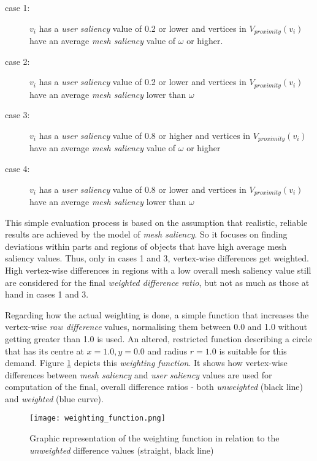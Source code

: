 \begin{description}
	\item [case 1:] $v_i$ has a \textit{user saliency} value of 0.2 or lower and vertices in $V_{proximity}(v_i)$ have an average \textit{mesh saliency} value of $\omega$ or higher.
	\item [case 2:] $v_i$ has a \textit{user saliency} value of 0.2 or lower and vertices in $V_{proximity}(v_i)$ have an average \textit{mesh saliency} lower than $\omega$
	\item [case 3:] $v_i$ has a \textit{user saliency} value of 0.8 or higher and vertices in $V_{proximity}(v_i)$ have an average \textit{mesh saliency} value of $\omega$ or higher
	\item [case 4:] $v_i$ has a \textit{user saliency} value of 0.8 or lower and vertices in $V_{proximity}(v_i)$ have an average \textit{mesh saliency} lower than $\omega$
\end{description}

This simple evaluation process is based on the assumption that realistic, reliable results are achieved by the model of \textit{mesh saliency}. So it focuses on finding deviations within parts and regions of objects that have high average mesh saliency values. Thus, only in cases 1 and 3, vertex-wise differences get weighted. High vertex-wise differences in regions with a low overall mesh saliency value still are considered for the final \textit{weighted difference ratio}, but not as much as those at hand in cases 1 and 3.

Regarding how the actual weighting is done, a simple function that increases the vertex-wise \textit{raw difference} values, normalising them between 0.0 and 1.0 without getting greater than 1.0 is used. An altered, restricted function describing a circle that has its centre at $x = 1.0, y = 0.0$ and radius $r = 1.0$ is suitable for this demand. Figure \ref{fig:weighting_function} depicts this \textit{weighting function}. It shows how vertex-wise differences between \textit{mesh saliency} and \textit{user saliency} values are used for computation of the final, overall difference ratios - both \textit{unweighted} (black line) and \textit{weighted} (blue curve).

\begin{figure}[htb]
  \centering
  \texttt{[image: weighting\_function.png]}\\ %
  \caption{Graphic representation of the weighting function in relation to the \textit{unweighted} difference values (straight, black line)}\label{fig:weighting_function}
\end{figure}

